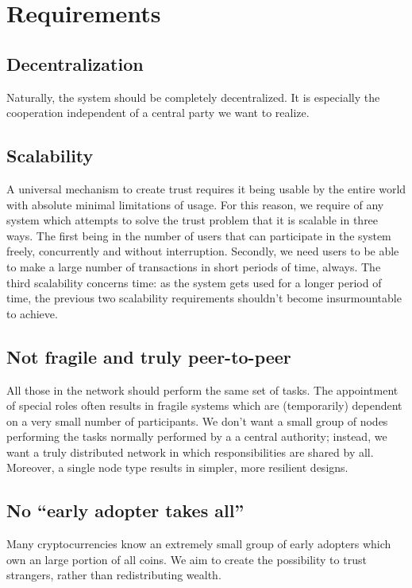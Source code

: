 \chapter{Requirements}
\section{Decentralization}
Naturally, the system should be completely decentralized. It is especially the cooperation independent of a central party we want to realize.

\section{Scalability}
A universal mechanism to create trust requires it being usable by the entire world with absolute minimal limitations of usage. For this reason, we require of any system which attempts to solve the trust problem that it is scalable in three ways. The first being in the number of users that can participate in the system freely, concurrently and without interruption. Secondly, we need users to be able to make a large number of transactions in short periods of time, always. The third scalability concerns time: as the system gets used for a longer period of time, the previous two scalability requirements shouldn't become insurmountable to achieve.

\section{Not fragile and truly peer-to-peer}
All those in the network should perform the same set of tasks. The appointment of special roles often results in fragile systems which are (temporarily) dependent on a very small number of participants. We don't want a small group of nodes performing the tasks normally performed by a a central authority; instead, we want a truly distributed network in which responsibilities are shared by all. Moreover, a single node type results in simpler, more resilient designs. 

\section{No ``early adopter takes all''}
Many cryptocurrencies know an extremely small group of early adopters which own an large portion of all coins. We aim to create the possibility to trust strangers, rather than redistributing wealth.
